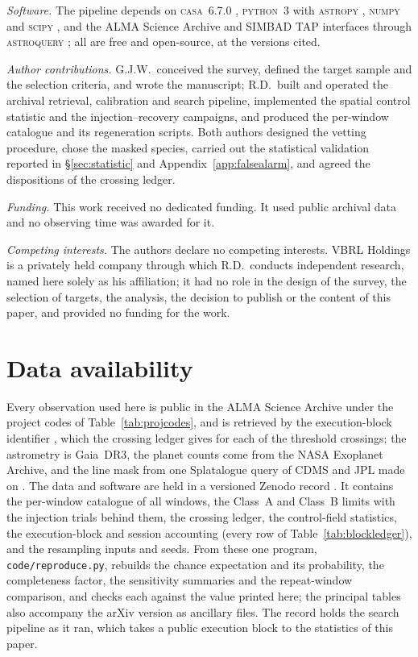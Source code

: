 \emph{Software.} The pipeline depends on \textsc{casa}~6.7.0
\citep{CASA2022}, \textsc{python}~3 with \textsc{astropy} \citep{Astropy2022}, \textsc{numpy}
\citep{Harris2020} and \textsc{scipy} \citep{Virtanen2020}, and the ALMA Science
Archive and SIMBAD TAP interfaces through \textsc{astroquery} \citep{Ginsburg2019};
all are free and open-source, at the versions cited.

\emph{Author contributions.} G.J.W.\ conceived the survey, defined the target
sample and the selection criteria, and wrote the manuscript; R.D.\ built and
operated the archival retrieval, calibration and search pipeline, implemented
the spatial control statistic and the injection--recovery campaigns, and
produced the per-window catalogue and its regeneration scripts. Both authors
designed the vetting procedure, chose the masked species, carried out the
statistical validation reported in \S\ref{sec:statistic} and
Appendix~\ref{app:falsealarm}, and agreed the dispositions of the crossing
ledger.

\emph{Funding.} This work received no dedicated funding. It used public archival data and
no observing time was awarded for it.

\emph{Competing interests.} The authors declare no competing interests. VBRL Holdings is a privately
held company through which R.D.\ conducts independent research, named
here solely as his affiliation; it had no role in the design of the
survey, the selection of targets, the analysis, the decision to publish
or the content of this paper, and provided no funding for the work.

\section*{Data availability}
\label{sec:data}
Every observation used here is public in the ALMA Science Archive under the
\NProjCodes{} project codes of Table~\ref{tab:projcodes}, and is retrieved by
the execution-block identifier \citep{Chen2022}, which the crossing ledger
gives for each of the \EvNCrossRaw{} threshold crossings; the astrometry is
Gaia~DR3, the planet counts come from the NASA Exoplanet Archive, and the line
mask from one Splatalogue query of CDMS and JPL made on \McQueryDate. The data
and software are held in a versioned Zenodo record \citep{SIdeposit}. It
contains the per-window catalogue of all \NWindows{} windows, the Class~A and
Class~B limits with the injection trials behind them, the crossing ledger, the
control-field statistics, the execution-block and session accounting (every
row of Table~\ref{tab:blockledger}), and the
resampling inputs and seeds. From these one program,
\texttt{code/reproduce.py}, rebuilds the chance expectation and its
probability, the completeness factor, the sensitivity summaries and the
repeat-window comparison, and checks each against the value printed here; the
principal tables also accompany the arXiv version as ancillary files. The
record holds the search pipeline as it ran, which takes a public execution
block to the statistics of this paper.


